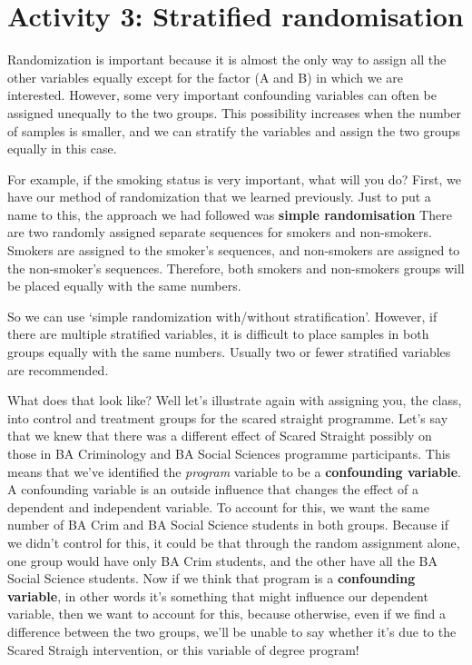 \documentclass[]{book}
\theoremstyle{definition}
\theoremstyle{definition}
\theoremstyle{definition}
\theoremstyle{remark}
\begin{document}
\hypertarget{activity-3-stratified-randomisation}{%
\section{Activity 3: Stratified
randomisation}\label{activity-3-stratified-randomisation}}

Randomization is important because it is almost the only way to assign
all the other variables equally except for the factor (A and B) in which
we are interested. However, some very important confounding variables
can often be assigned unequally to the two groups. This possibility
increases when the number of samples is smaller, and we can stratify the
variables and assign the two groups equally in this case.

For example, if the smoking status is very important, what will you do?
First, we have our method of randomization that we learned previously.
Just to put a name to this, the approach we had followed was
\textbf{simple randomisation} There are two randomly assigned separate
sequences for smokers and non-smokers. Smokers are assigned to the
smoker's sequences, and non-smokers are assigned to the non-smoker's
sequences. Therefore, both smokers and non-smokers groups will be placed
equally with the same numbers.

So we can use `simple randomization with/without stratification'.
However, if there are multiple stratified variables, it is difficult to
place samples in both groups equally with the same numbers. Usually two
or fewer stratified variables are recommended.

 What does that look like? Well let's illustrate again with assigning
you, the class, into control and treatment groups for the scared
straight programme. Let's say that we knew that there was a different
effect of Scared Straight possibly on those in BA Criminology and BA
Social Sciences programme participants. This means that we've identified
the \emph{program} variable to be a \textbf{confounding variable}. A
confounding variable is an outside influence that changes the effect of
a dependent and independent variable. To account for this, we want the
same number of BA Crim and BA Social Science students in both groups.
Because if we didn't control for this, it could be that through the
random assignment alone, one group would have only BA Crim students, and
the other have all the BA Social Science students. Now if we think that
program is a \textbf{confounding variable}, in other words it's
something that might influence our dependent variable, then we want to
account for this, because otherwise, even if we find a difference
between the two groups, we'll be unable to say whether it's due to the
Scared Straigh intervention, or this variable of degree program!
\end{document}
